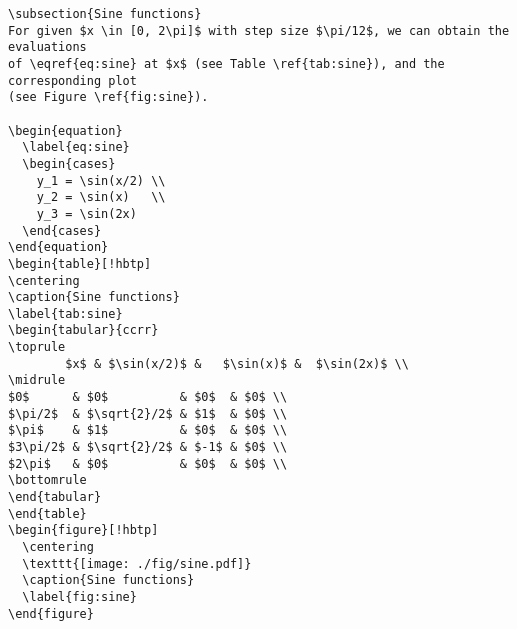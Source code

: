 \begin{verbatim}
\subsection{Sine functions}
For given $x \in [0, 2\pi]$ with step size $\pi/12$, we can obtain the evaluations
of \eqref{eq:sine} at $x$ (see Table \ref{tab:sine}), and the corresponding plot
(see Figure \ref{fig:sine}).

\begin{equation}
  \label{eq:sine}
  \begin{cases}
    y_1 = \sin(x/2) \\
    y_2 = \sin(x)   \\
    y_3 = \sin(2x)
  \end{cases}
\end{equation}
\begin{table}[!hbtp]
\centering
\caption{Sine functions}
\label{tab:sine}
\begin{tabular}{ccrr}
\toprule
        $x$ & $\sin(x/2)$ &   $\sin(x)$ &  $\sin(2x)$ \\
\midrule
$0$      & $0$          & $0$  & $0$ \\
$\pi/2$  & $\sqrt{2}/2$ & $1$  & $0$ \\
$\pi$    & $1$          & $0$  & $0$ \\
$3\pi/2$ & $\sqrt{2}/2$ & $-1$ & $0$ \\
$2\pi$   & $0$          & $0$  & $0$ \\
\bottomrule
\end{tabular}
\end{table}
\begin{figure}[!hbtp]
  \centering
  \texttt{[image: ./fig/sine.pdf]}
  \caption{Sine functions}
  \label{fig:sine}
\end{figure}


\end{verbatim}
